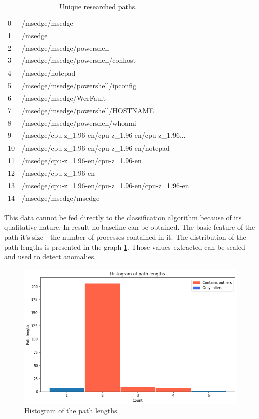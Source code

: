 \documentclass[a4paper,twoside,12pt]{book}
\begin{document}
\begin{table}
	\centering
	\caption{Unique researched paths.}
	\label{id:tab:uniqPaths}
	\begin{tabular}{ll}
		\toprule
		0  &                                     /msedge/msedge \\
		1  &                                            /msedge \\
		2  &                          /msedge/msedge/powershell \\
		3  &                  /msedge/msedge/powershell/conhost \\
		4  &                                    /msedge/notepad \\
		5  &                 /msedge/msedge/powershell/ipconfig \\
		6  &                            /msedge/msedge/WerFault \\
		7  &                 /msedge/msedge/powershell/HOSTNAME \\
		8  &                   /msedge/msedge/powershell/whoami \\
		9  &  /msedge/cpu-z\_1.96-en/cpu-z\_1.96-en/cpu-z\_1.96... \\
		10 &        /msedge/cpu-z\_1.96-en/cpu-z\_1.96-en/notepad \\
		11 &                /msedge/cpu-z\_1.96-en/cpu-z\_1.96-en \\
		12 &                              /msedge/cpu-z\_1.96-en \\
		13 &  /msedge/cpu-z\_1.96-en/cpu-z\_1.96-en/cpu-z\_1.96-en \\
		14 &                              /msedge/msedge/msedge \\
		\bottomrule
	\end{tabular}
\end{table}

This data cannot be fed directly to the classification algorithm because of its 
qualitative nature. In result no baseline can be obtained. The basic feature
of the path it's size - the number of processes contained in it. The distribution
of the path lengths is presented in the graph \ref{fig:pathLenHist}. Those values
extracted can be scaled and used to detect anomalies.

\begin{figure}
	\centering
	\includegraphics[scale=0.9]{images/pathLenHist}
	\caption{Histogram of the path lengths.}
	\label{fig:pathLenHist}
 \end{figure}
\end{document}
